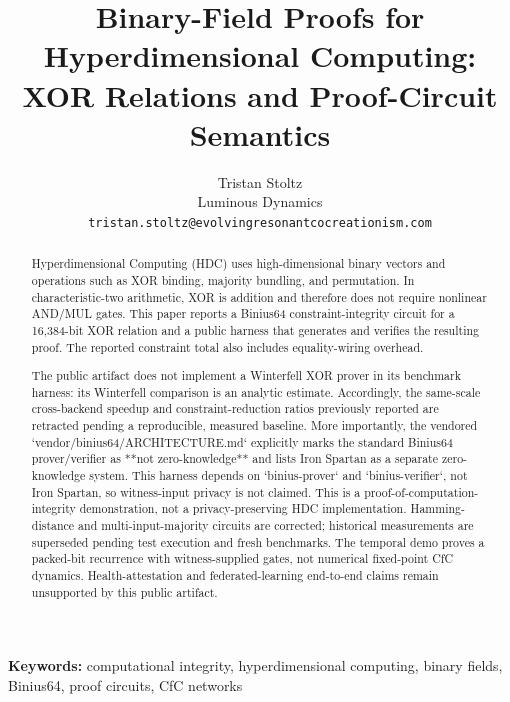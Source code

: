 \documentclass[11pt,twocolumn]{article}
\begin{document}
\title{Binary-Field Proofs for Hyperdimensional Computing:\\
XOR Relations and Proof-Circuit Semantics}

\author{
Tristan Stoltz\\
Luminous Dynamics\\
\texttt{tristan.stoltz@evolvingresonantcocreationism.com}
}

\maketitle

\begin{abstract}
Hyperdimensional Computing (HDC) uses high-dimensional binary vectors and operations such as XOR binding, majority bundling, and permutation. In characteristic-two arithmetic, XOR is addition and therefore does not require nonlinear AND/MUL gates. This paper reports a Binius64 constraint-integrity circuit for a 16,384-bit XOR relation and a public harness that generates and verifies the resulting proof. The reported constraint total also includes equality-wiring overhead.

The public artifact does not implement a Winterfell XOR prover in its benchmark harness: its Winterfell comparison is an analytic estimate. Accordingly, the same-scale cross-backend speedup and constraint-reduction ratios previously reported are retracted pending a reproducible, measured baseline. More importantly, the vendored `vendor/binius64/ARCHITECTURE.md` explicitly marks the standard Binius64 prover/verifier as **not zero-knowledge** and lists Iron Spartan as a separate zero-knowledge system. This harness depends on `binius-prover` and `binius-verifier`, not Iron Spartan, so witness-input privacy is not claimed. This is a proof-of-computation-integrity demonstration, not a privacy-preserving HDC implementation. Hamming-distance and multi-input-majority circuits are corrected; historical measurements are superseded pending test execution and fresh benchmarks. The temporal demo proves a packed-bit recurrence with witness-supplied gates, not numerical fixed-point CfC dynamics. Health-attestation and federated-learning end-to-end claims remain unsupported by this public artifact.
\end{abstract}

\noindent\textbf{Keywords:} computational integrity, hyperdimensional computing, binary fields, Binius64, proof circuits, CfC networks
\vspace{1em}
\end{document}

